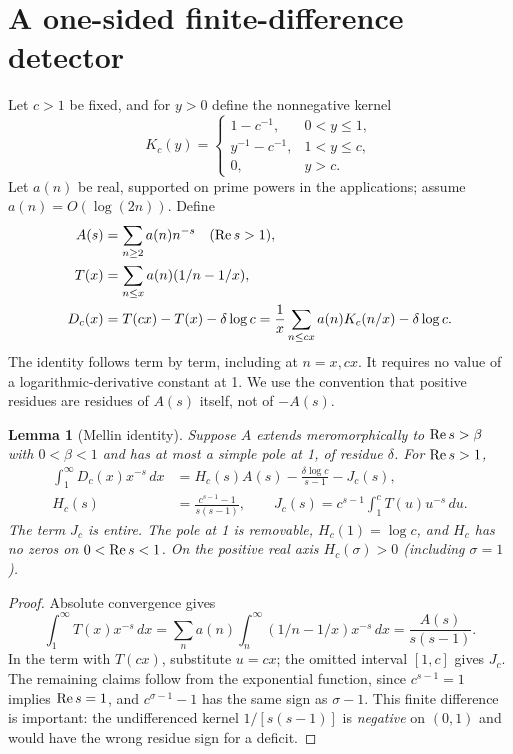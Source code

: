\documentclass[11pt]{article}
\newtheorem{lemma}[theorem]{Lemma}
\theoremstyle{definition}\newtheorem{definition}[theorem]{Definition}
\begin{document}
\section{A one-sided finite-difference detector}
Let $c>1$ be fixed, and for $y>0$ define the nonnegative kernel
\[
 K_c(y)=\begin{cases}1-c^{-1},&0<y\le1,\\ y^{-1}-c^{-1},&1<y\le c,\\0,&y>c.\end{cases}
\]
Let $a(n)$ be real, supported on prime powers in the applications; assume $a(n)=O(\log(2n))$. Define
\begin{align}
 A(s)&=\sum_{n\ge2}a(n)n^{-s} \quad (\operatorname{Re} s>1),\notag\\
 T(x)&=\sum_{n\le x}a(n)(1/n-1/x),\notag\\
 D_c(x)&=T(cx)-T(x)-\delta\log c
       =\frac1x\sum_{n\le cx}a(n)K_c(n/x)-\delta\log c.\label{defD}
\end{align}
The identity follows term by term, including at $n=x,cx$. It requires no value of a logarithmic-derivative constant at 1. We use the convention that positive residues are residues of $A(s)$ itself, not of $-A(s)$.

\begin{lemma}[Mellin identity]\label{mellin}
Suppose $A$ extends meromorphically to $\operatorname{Re} s>\beta$ with $0<\beta<1$ and has at most a simple pole at 1, of residue $\delta$. For $\operatorname{Re} s>1$,
\begin{align*}
 \int_1^\infty D_c(x)x^{-s}\,dx
 &=H_c(s)A(s)-\frac{\delta\log c}{s-1}-J_c(s),\\
 H_c(s)&=\frac{c^{s-1}-1}{s(s-1)},\qquad
 J_c(s)=c^{s-1}\int_1^c T(u)u^{-s}\,du.
\end{align*}
The term $J_c$ is entire. The pole at 1 is removable, $H_c(1)=\log c$, and $H_c$ has no zeros on $0<\operatorname{Re} s<1$. On the positive real axis $H_c(\sigma)>0$ (including $\sigma=1$).
\end{lemma}
\begin{proof}
Absolute convergence gives
\[
 \int_1^\infty T(x)x^{-s}\,dx=\sum_n a(n)\int_n^\infty(1/n-1/x)x^{-s}\,dx=\frac{A(s)}{s(s-1)}.
\]
In the term with $T(cx)$, substitute $u=cx$; the omitted interval $[1,c]$ gives $J_c$. The remaining claims follow from the exponential function, since $c^{s-1}=1$ implies $\operatorname{Re} s=1$, and $c^{\sigma-1}-1$ has the same sign as $\sigma-1$. This finite difference is important: the undifferenced kernel $1/[s(s-1)]$ is \emph{negative} on $(0,1)$ and would have the wrong residue sign for a deficit.
\end{proof}
\end{document}
